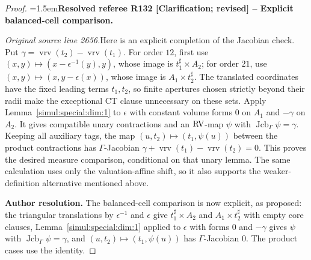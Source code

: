 \documentclass[12pt]{amsart}
\newcommand{\ResolvedRefereeRemark}[5]{%
  \par\medskip\begingroup\normalfont\small\color{gray}%
  \emergencystretch=1.5em\noindent\textbf{Resolved referee R#1 [#2] -- #3.}\par\nobreak\noindent #4\par
  \medskip\color{ResolutionGreen}\noindent\textbf{Author resolution.} #5\par
  \endgroup\medskip
}
\theoremstyle{plain}
\theoremstyle{definition}
\theoremstyle{remark}
\numberwithin{equation}{section}
\theoremstyle{plain}
\newcommand{\RV}{\textup{RV}}
\DeclareMathOperator{\jcb}{Jcb}
\newcommand{\0}{\emptyset}
\DeclareMathOperator{\vrv}{vrv}
\begin{document}
\begin{proof}
\ResolvedRefereeRemark{132}{Clarification; revised}{Explicit balanced-cell comparison}{%
\textit{Original source line 2656.}\quad Here is an explicit completion of the Jacobian check. Put $\gamma=\vrv(t_2)-\vrv(t_1)$. For order $12$, first use $(x,y)\mapsto(x-\epsilon^{-1}(y),y)$, whose image is $t_1^\sharp\times A_2$; for order $21$, use $(x,y)\mapsto(x,y-\epsilon(x))$, whose image is $A_1\times t_2^\sharp$. The translated coordinates have the fixed leading terms $t_1,t_2$, so finite apertures chosen strictly beyond their radii make the exceptional CT clause unnecessary on these sets. Apply Lemma~\ref{simul:special:dim:1} to $\epsilon$ with constant volume forms $0$ on $A_1$ and $-\gamma$ on $A_2$. It gives compatible unary contractions and an $\RV$-map $\psi$ with $\jcb_\Gamma\psi=\gamma$. Keeping all auxiliary tags, the map $(u,t_2)\mapsto(t_1,\psi(u))$ between the product contractions has $\Gamma$-Jacobian $\gamma+\vrv(t_1)-\vrv(t_2)=0$. This proves the desired measure comparison, conditional on that unary lemma. The same calculation uses only the valuation-affine shift, so it also supports the weaker-definition alternative mentioned above.
}{The balanced-cell comparison is now explicit, as proposed: the triangular translations by $\epsilon^{-1}$ and $\epsilon$ give $t_1^\sharp\times A_2$ and $A_1\times t_2^\sharp$ with empty core clauses, Lemma~\ref{simul:special:dim:1} applied to $\epsilon$ with forms $0$ and $-\gamma$ gives $\psi$ with $\jcb_\Gamma\psi=\gamma$, and $(u,t_2)\mapsto(t_1,\psi(u))$ has $\Gamma$-Jacobian $0$. The product cases use the identity.}
\end{proof}
\end{document}
